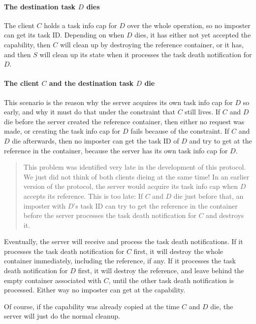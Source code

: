 \documentclass[9pt,a4paper]{extarticle}
\newenvironment{comment}{\footnotesize \begin{quote}}{\end{quote}}
\begin{document}
\paragraph{The destination task $D$ dies}

The client $C$ holds a task info cap for $D$ over the whole operation,
so no imposter can get its task ID.  Depending on when $D$ dies, it
has either not yet accepted the capability, then $C$ will clean up by
destroying the reference container, or it has, and then $S$ will clean
up its state when it processes the task death notification for $D$.

\paragraph{The client $C$ and the destination task $D$ die}

This scenario is the reason why the server acquires its own task info
cap for $D$ so early, and why it must do that under the constraint
that $C$ still lives.  If $C$ and $D$ die before the server created
the reference container, then either no request was made, or creating
the task info cap for $D$ fails because of the constraint.  If $C$ and
$D$ die afterwards, then no imposter can get the task ID of $D$ and
try to get at the reference in the container, because the server has
its own task info cap for $D$.

\begin{comment}
  This problem was identified very late in the development of this
  protocol.  We just did not think of both clients dieing at the same
  time!  In an earlier version of the protocol, the server would
  acquire its task info cap when $D$ accepts its reference.  This is
  too late: If $C$ and $D$ die just before that, an imposter with
  $D$'s task ID can try to get the reference in the container before
  the server processes the task death notification for $C$ and
  destroys it.
\end{comment}

Eventually, the server will receive and process the task death
notifications.  If it processes the task death notification for $C$
first, it will destroy the whole container immediately, including the
reference, if any.  If it processes the task death notification for
$D$ first, it will destroy the reference, and leave behind the empty
container associated with $C$, until the other task death notification
is processed.  Either way no imposter can get at the capability.

Of course, if the capability was already copied at the time $C$ and
$D$ die, the server will just do the normal cleanup.
\end{document}
